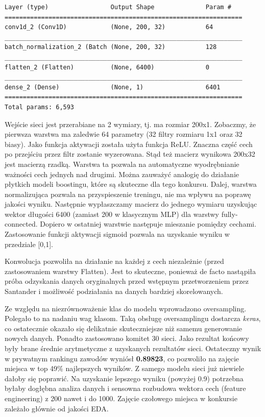 \documentclass[12pt]{article}
\begin{document}
\begin{lstlisting}[caption={Model sieci CNN}, captionpos=b]
Layer (type)                 Output Shape              Param #   
=================================================================
conv1d_2 (Conv1D)            (None, 200, 32)           64        
_________________________________________________________________
batch_normalization_2 (Batch (None, 200, 32)           128       
_________________________________________________________________
flatten_2 (Flatten)          (None, 6400)              0         
_________________________________________________________________
dense_2 (Dense)              (None, 1)                 6401      
=================================================================
Total params: 6,593
\end{lstlisting} 

Wejście sieci jest przerabiane na 2 wymiary, tj. ma rozmiar 200x1. 
Zobaczmy, że pierwsza warstwa ma zaledwie 64 parametry (32 filtry rozmiaru 1x1 oraz 32 biasy). Jako funkcja aktywacji została użyta funkcja ReLU. Znaczna część cech po przejściu przez filtr zostanie wyzerowana. Stąd też macierz wynikowa 200x32 jest macierzą rzadką. Warstwa ta pozwala na automatyczne wyodrębnianie ważności cech jednych nad drugimi. Można zauważyć analogię do działanie płytkich modeli boostingu, które są skuteczne dla tego konkursu. Dalej, warstwa normalizująca pozwala na przyspieszenie treningu, nie ma wpływu na poprawę jakości wyniku. Następnie wypłaszczamy macierz do jednego wymiaru uzyskując wektor długości 6400 (zamiast 200 w klasycznym MLP) dla warstwy fully-connected. Dopiero w ostatniej warstwie następuje mieszanie pomiędzy cechami. Zastosowanie funkcji aktywacji sigmoid pozwala na uzyskanie wyniku w przedziale [0,1].

Konwolucja pozwoliła na działanie na każdej z cech niezależnie (przed zastosowaniem warstwy Flatten). Jest to skuteczne, ponieważ de facto nastąpiła próba odzyskania danych oryginalnych przed wstępnym przetworzeniem przez Santander i możliwość podziałania na danych bardziej skorelowanych. 

Ze względu na niezrównoważenie klas do modelu wprowadzono oversampling. Polegało to na nadaniu wag klasom. Taką obsługę oversamplingu dostarcza \textit{keras}, co ostatecznie okazało się delikatnie skuteczniejsze niż samemu generowanie nowych danych. Ponadto zastosowano komitet 30 sieci. Jako rezultat końcowy były brane średnie arytmetyczne z uzyskanych rezultatów sieci. Ostateczny wynik w prywatnym rankingu zawodów wyniósł \textbf{0.89823}, co pozwoliło na zajęcie miejsca w top 49\% najlepszych wyników. Z samego modelu sieci już niewiele dałoby się poprawić. Na uzyskanie lepszego wyniku (powyżej 0.9) potrzebna byłaby dogłębna analiza danych i sensowna rozbudowa wektora cech (feature engineering) z 200 nawet i do 1000. Zajęcie czołowego miejsca w konkursie zależało głównie od jakości EDA.
\end{document}
